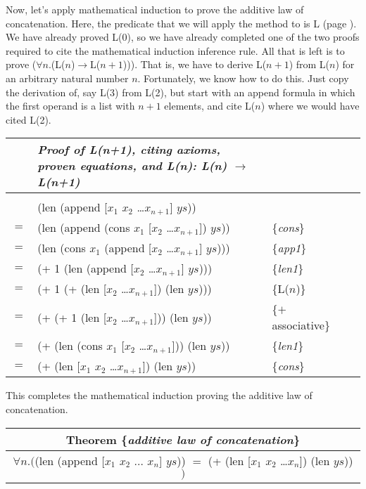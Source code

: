 \label{induction-hyp-def}Now,
let's apply mathematical induction to prove
the additive law of concatenation.
Here, the predicate that we will apply the method to is L
(page \pageref{additive-concat-law-predicate}).
\label{len-additive-thm}We
have already proved L(0), so we have already completed one of the
two proofs required to cite the mathematical induction inference rule.
All that is left is to prove ($\forall$$n$.(L($n$)$\rightarrow$L($n+1$))).
That is, we have to derive L($n+1$) from L($n$) for an arbitrary natural number $n$.
Fortunately, we know how to do this. Just copy the derivation of,
say L(3) from L(2), but start with an append formula in which the first operand
is a list with $n+1$ elements, and cite L($n$) where we would have cited L(2).
\begin{center}
\begin{tabular}{llll}
&\emph{Proof of L(n+1), citing axioms, proven equations, and L(n): L(n) $\rightarrow$ L(n+1)}&&\\
\hline\\[-1.0em]
    & \textsf{(len (append [$x_1$ $x_2$ \dots $x_{n+1}$] $ys$))}         &                     &~\\
$=$ & \textsf{(len (append (cons $x_1$ [$x_2$ \dots $x_{n+1}$]) $ys$))}  & \{\emph{cons}\}     &~\\
$=$ & \textsf{(len (cons $x_1$ (append [$x_2$ \dots $x_{n+1}$] $ys$)))}  & \{\emph{app1}\}     &~\\
$=$ & \textsf{(+ 1 (len (append [$x_2$ \dots $x_{n+1}$] $ys$)))}         & \{\emph{len1}\}     &~\\
$=$ & \textsf{(+ 1 (+ (len [$x_2$ \dots $x_{n+1}$]) (len $ys$)))}        & \{L($n$)\}          &~\\
$=$ & \textsf{(+ (+ 1 (len [$x_2$ \dots $x_{n+1}$])) (len $ys$))}        & \{$+$ associative\} &~\\
$=$ & \textsf{(+ (len (cons $x_1$ [$x_2$ \dots $x_{n+1}$])) (len $ys$))} & \{\emph{len1}\}     &~\\
$=$ & \textsf{(+ (len [$x_1$ $x_2$ \dots $x_{n+1}$]) (len $ys$))}        & \{\emph{cons}\}     &~\\
\end{tabular}
\end{center}
This completes the mathematical induction proving the
additive law of concatenation.

\begin{center}
\label{additive-law-concatenation}
\begin{tabular}{c}
Theorem \{\emph{additive law of concatenation}\} \\
\hline
$\forall n.($\textsf{(len (append [$x_1$ $x_2$ $\dots$ $x_n$] $ys$))}
$=$ \textsf{(+ (len [$x_1$ $x_2$ \dots $x_n$]) (len $ys$))}$)$\\
\end{tabular}
\end{center}

